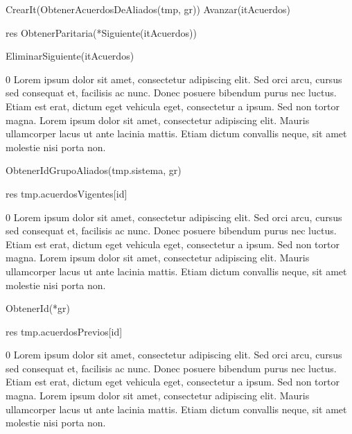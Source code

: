 {
	\state {} \asig CrearIt(ObtenerAcuerdosDeAliados(tmp, gr))		
			
		\state
		\state Avanzar(itAcuerdos)  						
	\endwhile
	\state

	\state res \asig ObtenerParitaria(*Siguiente(itAcuerdos))		

	\state EliminarSiguiente(itAcuerdos)							
}
{0}
{Lorem ipsum dolor sit amet, consectetur adipiscing elit. Sed orci arcu, cursus sed consequat et, facilisis ac nunc. Donec posuere bibendum purus nec luctus. Etiam est erat, dictum eget vehicula eget, consectetur a ipsum. Sed non tortor magna. Lorem ipsum dolor sit amet, consectetur adipiscing elit. Mauris ullamcorper lacus ut ante lacinia mattis. Etiam dictum convallis neque, sit amet molestie nisi porta non.}

{
	\state {} \asig ObtenerIdGrupoAliados(tmp.sistema, gr)		

	\state res \asig tmp.acuerdosVigentes[id]									
}
{0}
{Lorem ipsum dolor sit amet, consectetur adipiscing elit. Sed orci arcu, cursus sed consequat et, facilisis ac nunc. Donec posuere bibendum purus nec luctus. Etiam est erat, dictum eget vehicula eget, consectetur a ipsum. Sed non tortor magna. Lorem ipsum dolor sit amet, consectetur adipiscing elit. Mauris ullamcorper lacus ut ante lacinia mattis. Etiam dictum convallis neque, sit amet molestie nisi porta non.}

{
	\state {} \asig ObtenerId(*gr)			

	\state res \asig tmp.acuerdosPrevios[id]				
}
{0}
{Lorem ipsum dolor sit amet, consectetur adipiscing elit. Sed orci arcu, cursus sed consequat et, facilisis ac nunc. Donec posuere bibendum purus nec luctus. Etiam est erat, dictum eget vehicula eget, consectetur a ipsum. Sed non tortor magna. Lorem ipsum dolor sit amet, consectetur adipiscing elit. Mauris ullamcorper lacus ut ante lacinia mattis. Etiam dictum convallis neque, sit amet molestie nisi porta non.}